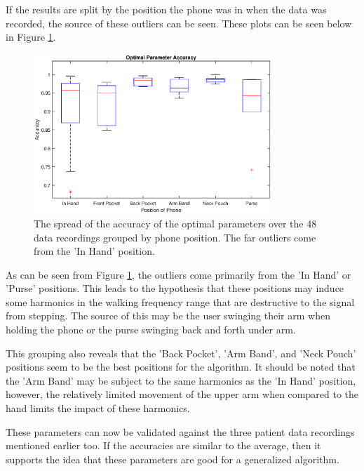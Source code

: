             If the results are split by the position the phone was in when the data was recorded, the source of these outliers can be seen. These plots can be seen below in Figure \ref{img_opt_params_positions_bp}.

            \begin{figure}[!th]
                \includegraphics[width=0.8\textwidth]{Images/opt_params_positions_bp.eps}
                \centering
                \caption{The spread of the accuracy of the optimal parameters over the 48 data recordings grouped by phone position. The far outliers come from the 'In Hand' position.}
                \label{img_opt_params_positions_bp}
            \end{figure}

            As can be seen from Figure \ref{img_opt_params_positions_bp}, the outliers come primarily from the 'In Hand' or 'Purse' positions. This leads to the hypothesis that these positions may induce some harmonics in the walking frequency range that are destructive to the signal from stepping. The source of this may be the user swinging their arm when holding the phone or the purse swinging back and forth under arm.

            This grouping also reveals that the 'Back Pocket', 'Arm Band', and 'Neck Pouch' positions seem to be the best positions for the algorithm. It should be noted that the 'Arm Band' may be subject to the same harmonics as the 'In Hand' position, however, the relatively limited movement of the upper arm when compared to the hand limits the impact of these harmonics.

            These parameters can now be validated against the three patient data recordings mentioned earlier too. If the accuracies are similar to the average, then it supports the idea that these parameters are good for a generalized algorithm.

